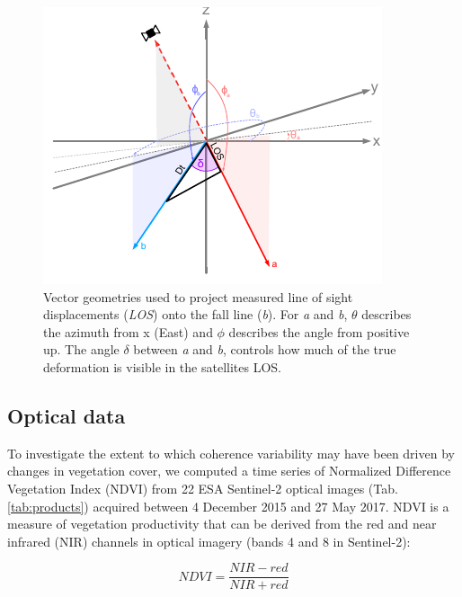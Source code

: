 \documentclass[nhess, manuscript]{copernicus}
\begin{document}
\begin{figure}[hbt!]
    \centering
    \includegraphics[scale = 1.5]{los_projections.pdf}
    \caption{Vector geometries used to project measured line of sight displacements (\textit{LOS}) onto the fall line (\textit{b}). For \textit{a} and \textit{b}, $\theta$ describes the azimuth from x (East) and $\phi$ describes the angle from positive up. The angle $\delta$ between \textit{a} and \textit{b}, controls how much of the true deformation is visible in the satellites LOS.}
    \label{fig:los}
\end{figure}  

\subsection{Optical data}
To investigate the extent to which coherence variability may have been driven by changes in vegetation cover, we computed a time series of Normalized Difference Vegetation Index (NDVI) from 22 ESA Sentinel-2 optical images (Tab. \ref{tab:products}) acquired between 4 December 2015 and 27 May 2017. NDVI is a measure of vegetation productivity that can be derived from the red  and near infrared (NIR) channels in optical imagery (bands 4 and 8 in Sentinel-2):  \par

\begin{equation}
    NDVI = \frac{{NIR - red}}{{NIR + red}}
\end{equation}
\end{document}
